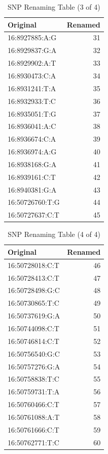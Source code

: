 \documentclass{article}\usepackage[]{graphicx}\usepackage[]{color}
\begin{document}
\begin{table}[h!]
\centering
\caption{SNP Renaming Table (3 of 4)}
\begin{tabular}{|l|r|}
\hline
\textbf{Original} & \textbf{Renamed} \\
\hline
16:8927885:A:G  & 31 \\
16:8929837:G:A  & 32 \\
16:8929902:A:T  & 33 \\
16:8930473:C:A  & 34 \\
16:8931241:T:A  & 35 \\
16:8932933:T:C  & 36 \\
16:8935051:T:G  & 37 \\
16:8936041:A:C  & 38 \\
16:8936674:C:A  & 39 \\
16:8936974:A:G  & 40 \\
16:8938168:G:A  & 41 \\
16:8939161:C:T  & 42 \\
16:8940381:G:A  & 43 \\
16:50726760:T:G & 44 \\
16:50727637:C:T & 45 \\
\hline
\end{tabular}
\end{table}

\begin{table}[h!]
\centering
\caption{SNP Renaming Table (4 of 4)}
\begin{tabular}{|l|r|}
\hline
\textbf{Original} & \textbf{Renamed} \\
\hline
16:50728018:C:T & 46 \\
16:50728413:C:T & 47 \\
16:50728498:G:C & 48 \\
16:50730865:T:C & 49 \\
16:50737619:G:A & 50 \\
16:50744098:C:T & 51 \\
16:50746814:C:T & 52 \\
16:50756540:G:C & 53 \\
16:50757276:G:A & 54 \\
16:50758838:T:C & 55 \\
16:50759731:T:A & 56 \\
16:50760466:C:T & 57 \\
16:50761088:A:T & 58 \\
16:50761666:C:T & 59 \\
16:50762771:T:C & 60 \\
\hline
\end{tabular}
\end{table}


\end{document}
